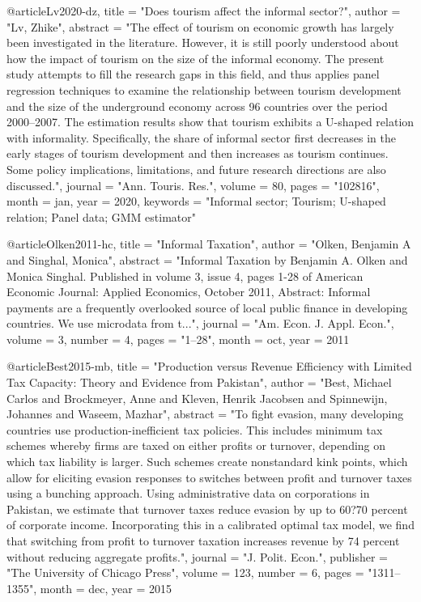 {@article{Lv2020-dz,
	title    = "Does tourism affect the informal sector?",
	author   = "Lv, Zhike",
	abstract = "The effect of tourism on economic growth has largely been
	investigated in the literature. However, it is still poorly
	understood about how the impact of tourism on the size of the
	informal economy. The present study attempts to fill the research
	gaps in this field, and thus applies panel regression techniques
	to examine the relationship between tourism development and the
	size of the underground economy across 96 countries over the
	period 2000--2007. The estimation results show that tourism
	exhibits a U-shaped relation with informality. Specifically, the
	share of informal sector first decreases in the early stages of
	tourism development and then increases as tourism continues. Some
	policy implications, limitations, and future research directions
	are also discussed.",
	journal  = "Ann. Touris. Res.",
	volume   =  80,
	pages    = "102816",
	month    =  jan,
	year     =  2020,
	keywords = "Informal sector; Tourism; U-shaped relation; Panel data; GMM
	estimator"
}

@article{Olken2011-hc,
	title    = "Informal Taxation",
	author   = "Olken, Benjamin A and Singhal, Monica",
	abstract = "Informal Taxation by Benjamin A. Olken and Monica Singhal.
	Published in volume 3, issue 4, pages 1-28 of American Economic
	Journal: Applied Economics, October 2011, Abstract: Informal
	payments are a frequently overlooked source of local public
	finance in developing countries. We use microdata from t...",
	journal  = "Am. Econ. J. Appl. Econ.",
	volume   =  3,
	number   =  4,
	pages    = "1--28",
	month    =  oct,
	year     =  2011
}

@article{Best2015-mb,
	title     = "Production versus Revenue Efficiency with Limited Tax Capacity:
	Theory and Evidence from Pakistan",
	author    = "Best, Michael Carlos and Brockmeyer, Anne and Kleven, Henrik
	Jacobsen and Spinnewijn, Johannes and Waseem, Mazhar",
	abstract  = "To fight evasion, many developing countries use
	production-inefficient tax policies. This includes minimum tax
	schemes whereby firms are taxed on either profits or turnover,
	depending on which tax liability is larger. Such schemes create
	nonstandard kink points, which allow for eliciting evasion
	responses to switches between profit and turnover taxes using a
	bunching approach. Using administrative data on corporations in
	Pakistan, we estimate that turnover taxes reduce evasion by up
	to 60?70 percent of corporate income. Incorporating this in a
	calibrated optimal tax model, we find that switching from profit
	to turnover taxation increases revenue by 74 percent without
	reducing aggregate profits.",
	journal   = "J. Polit. Econ.",
	publisher = "The University of Chicago Press",
	volume    =  123,
	number    =  6,
	pages     = "1311--1355",
	month     =  dec,
	year      =  2015
}

}
